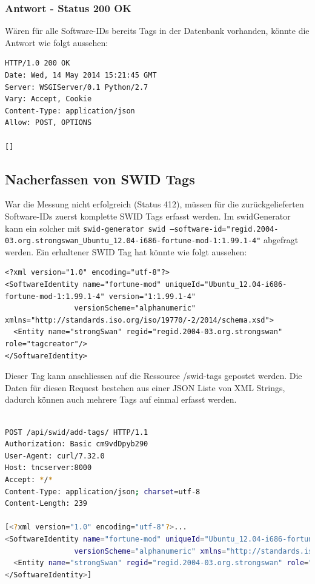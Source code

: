 \documentclass[10pt,a4paper]{scrartcl}
\begin{document}
\subsubsection{Antwort - Status 200 OK}
Wären für alle Software-IDs bereits Tags in der Datenbank vorhanden, könnte die Antwort wie folgt aussehen:
\begin{lstlisting}
HTTP/1.0 200 OK
Date: Wed, 14 May 2014 15:21:45 GMT
Server: WSGIServer/0.1 Python/2.7
Vary: Accept, Cookie
Content-Type: application/json
Allow: POST, OPTIONS

[]
\end{lstlisting}

\subsection{Nacherfassen von SWID Tags}
War die Messung nicht erfolgreich (Status 412), müssen für die zurückgelieferten Software-IDs zuerst komplette SWID Tags erfasst werden.
Im swidGenerator kann ein solcher mit \texttt{swid-generator swid --software-id="regid.2004-03.org.strongswan\_Ubuntu\_12.04-i686-fortune-mod-1:1.99.1-4"} abgefragt werden.
Ein erhaltener SWID Tag hat könnte wie folgt aussehen:

\lstset{language=XML}
\begin{lstlisting}
<?xml version="1.0" encoding="utf-8"?>
<SoftwareIdentity name="fortune-mod" uniqueId="Ubuntu_12.04-i686-fortune-mod-1:1.99.1-4" version="1:1.99.1-4"
	   			versionScheme="alphanumeric" xmlns="http://standards.iso.org/iso/19770/-2/2014/schema.xsd">
  <Entity name="strongSwan" regid="regid.2004-03.org.strongswan" role="tagcreator"/>
</SoftwareIdentity>
\end{lstlisting}

Dieser Tag kann anschliessen auf die Ressource /swid-tags gepostet werden. Die Daten für diesen Request bestehen aus einer JSON Liste von XML Strings, dadurch können auch mehrere Tags auf einmal erfasst werden.

\begin{lstlisting}[language=BASH]

POST /api/swid/add-tags/ HTTP/1.1
Authorization: Basic cm9vdDpyb290
User-Agent: curl/7.32.0
Host: tncserver:8000
Accept: */*
Content-Type: application/json; charset=utf-8
Content-Length: 239

[<?xml version="1.0" encoding="utf-8"?>...
<SoftwareIdentity name="fortune-mod" uniqueId="Ubuntu_12.04-i686-fortune-mod-1:1.99.1-4" version="1:1.99.1-4"
	   			versionScheme="alphanumeric" xmlns="http://standards.iso.org/iso/19770/-2/2014/schema.xsd">
  <Entity name="strongSwan" regid="regid.2004-03.org.strongswan" role="tagcreator"/>
</SoftwareIdentity>]
\end{lstlisting}
\end{document}
